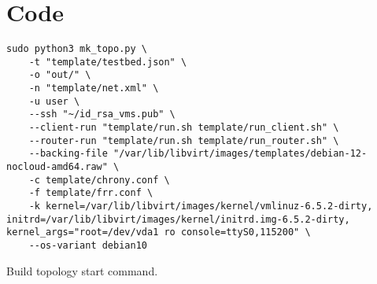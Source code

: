 \chapter{Code} %
\label{chap:Code}

\begin{listing}
\begin{verbatim}
sudo python3 mk_topo.py \
    -t "template/testbed.json" \
    -o "out/" \
    -n "template/net.xml" \
    -u user \
    --ssh "~/id_rsa_vms.pub" \
    --client-run "template/run.sh template/run_client.sh" \
    --router-run "template/run.sh template/run_router.sh" \
    --backing-file "/var/lib/libvirt/images/templates/debian-12-nocloud-amd64.raw" \
    -c template/chrony.conf \
    -f template/frr.conf \
    -k kernel=/var/lib/libvirt/images/kernel/vmlinuz-6.5.2-dirty, initrd=/var/lib/libvirt/images/kernel/initrd.img-6.5.2-dirty, kernel_args="root=/dev/vda1 ro console=ttyS0,115200" \
    --os-variant debian10
\end{verbatim}
\caption{Build topology start command.}
\label{lst:cmd_mk_topo_start}
\end{listing}
